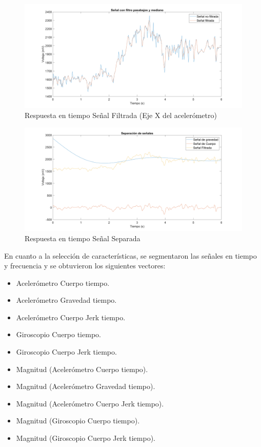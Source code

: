 \documentclass[11pt]{report}
\begin{document}
 \begin{figure}[H]
  \centering
    \includegraphics[width=1\textwidth]{senal_filtrada}
   \caption{Respuesta en tiempo Señal Filtrada (Eje X del acelerómetro)}
  \end{figure}

 \begin{figure}[H]
  \centering
    \includegraphics[width=1\textwidth]{senal_separada}
   \caption{Respuesta en tiempo Señal Separada}
  \end{figure}


\par
\medskip
\noindent

En cuanto a la selección de características, se segmentaron las señales en tiempo y frecuencia y se obtuvieron los siguientes vectores:

\begin{itemize}
\item Acelerómetro Cuerpo tiempo.
\item Acelerómetro Gravedad tiempo.
\item Acelerómetro Cuerpo Jerk tiempo.
\item Giroscopio Cuerpo tiempo.
\item Giroscopio Cuerpo Jerk tiempo.
\item Magnitud (Acelerómetro Cuerpo tiempo).
\item Magnitud (Acelerómetro Gravedad tiempo).
\item Magnitud (Acelerómetro Cuerpo Jerk tiempo).
\item Magnitud (Giroscopio Cuerpo tiempo).
\item Magnitud (Giroscopio Cuerpo Jerk tiempo).
\end{itemize}
\end{document}
